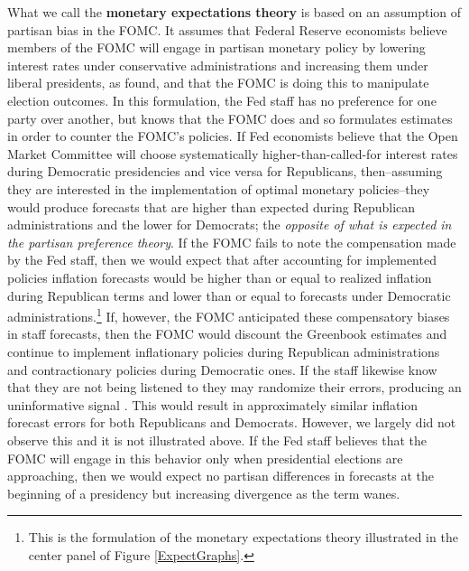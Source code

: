 \documentclass[a4paper]{article}\usepackage{graphicx, color}
\begin{document}
What we call the {\bf{monetary expectations theory}} is based on an assumption of partisan bias in the FOMC. It assumes that Federal Reserve economists believe members of the FOMC will engage in partisan monetary policy by lowering interest rates under conservative administrations and increasing them under liberal presidents, as \cite{Clark2012} found, and that the FOMC is doing this to manipulate election outcomes. In this formulation, the Fed staff has no preference for one party over another, but knows that the FOMC does and so formulates estimates in order to counter the FOMC's policies. If Fed economists believe that the Open Market Committee will choose systematically higher-than-called-for interest rates during Democratic presidencies and vice versa for Republicans, then--assuming they are interested in the implementation of optimal monetary policies--they would produce forecasts that are higher than expected during Republican administrations and the lower for Democrats; the {\emph{opposite of what is expected in the partisan preference theory}}. If the FOMC fails to note the compensation made by the Fed staff, then we would expect that after accounting for implemented policies inflation forecasts would be higher than or equal to realized inflation during Republican terms and lower than or equal to forecasts under Democratic administrations.\footnote{This is the formulation of the monetary expectations theory illustrated in the center panel of Figure \ref{ExpectGraphs}.} If, however, the FOMC anticipated these compensatory biases in staff forecasts, then the FOMC would discount the Greenbook estimates and continue to implement inflationary policies during Republican administrations and contractionary policies during Democratic ones. If the staff likewise know that they are not being listened to they may randomize their errors, producing an uninformative signal \citep{Crawford1982}. This would result in approximately similar inflation forecast errors for both Republicans and Democrats. However, we largely did not observe this and it is not illustrated above. If the Fed staff believes that the FOMC will engage in this behavior only when presidential elections are approaching, then we would expect no partisan differences in forecasts at the beginning of a presidency but increasing divergence as the term wanes.
 
\end{document}
